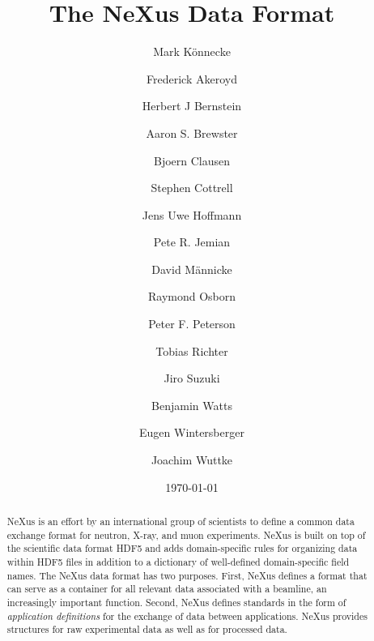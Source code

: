 \documentclass[%
 aip,
rsi,
 amsmath,amssymb,
 reprint,%
]{revtex4-1}
\begin{document}

\title{The NeXus Data Format}


\author{Mark K\"onnecke}

\author{Frederick Akeroyd}

\author{Herbert J Bernstein}

\author{Aaron S. Brewster}

\author{Bjoern Clausen}

\author{Stephen Cottrell}

\author{Jens Uwe Hoffmann}

\author{Pete R. Jemian}

\author{David M\"annicke}

\author{Raymond Osborn}

\author{Peter F. Peterson}

\author{Tobias Richter}

\author{Jiro Suzuki}

\author{Benjamin Watts}

\author{Eugen Wintersberger}

\author{Joachim Wuttke}



\date{\today}%

\begin{abstract}
NeXus is an effort by an international group of scientists to define 
 a common data exchange format for neutron, X-ray, and muon experiments.   
NeXus is built on top of the scientific data format HDF5 and adds 
domain-specific 
rules for organizing data within HDF5 files in addition to a dictionary of well-defined 
domain-specific field names. The NeXus data format has two purposes.  First, NeXus defines a
format that can serve as a container for all relevant data associated
with a beamline, an increasingly important function.  Second, NeXus
defines standards in the form of \emph{application definitions} for the
exchange of data between applications.  NeXus provides structures for raw experimental data as well as for processed data.  
\end{abstract}
\end{document}
